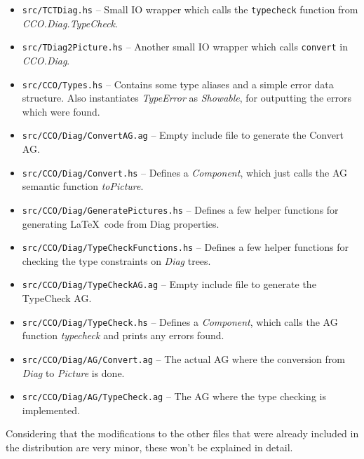 \documentclass[a4paper]{article}
\begin{document}
\begin{itemize}
    \item \texttt{src/TCTDiag.hs} -- Small IO wrapper which calls the \texttt{typecheck} function from \emph{CCO.Diag.TypeCheck}. 
    \item \texttt{src/TDiag2Picture.hs} -- Another small IO wrapper which calls \texttt{convert} in \emph{CCO.Diag}.
    \item \texttt{src/CCO/Types.hs} -- Contains some type aliases and a simple error data structure. Also instantiates \emph{TypeError} as \emph{Showable}, for outputting the errors which were found. 
    \item \texttt{src/CCO/Diag/ConvertAG.ag} -- Empty include file to generate the Convert AG.
    \item \texttt{src/CCO/Diag/Convert.hs} -- Defines a \emph{Component}, which just calls the AG semantic function \emph{toPicture}. 
    \item \texttt{src/CCO/Diag/GeneratePictures.hs} -- Defines a few helper functions for generating \LaTeX\ code from Diag properties.
    \item \texttt{src/CCO/Diag/TypeCheckFunctions.hs} -- Defines a few helper functions for checking the type constraints on \emph{Diag} trees. 
    \item \texttt{src/CCO/Diag/TypeCheckAG.ag} -- Empty include file to generate the TypeCheck AG.
    \item \texttt{src/CCO/Diag/TypeCheck.hs} -- Defines a \emph{Component}, which calls the AG function \emph{typecheck} and prints any errors found.
    \item \texttt{src/CCO/Diag/AG/Convert.ag} -- The actual AG where the conversion from \emph{Diag} to \emph{Picture} is done. 
    \item \texttt{src/CCO/Diag/AG/TypeCheck.ag} -- The AG where the type checking is implemented.
\end{itemize}

Considering that the modifications to the other files that were already included in the distribution are very minor, these won't be explained in detail. 
\end{document}
